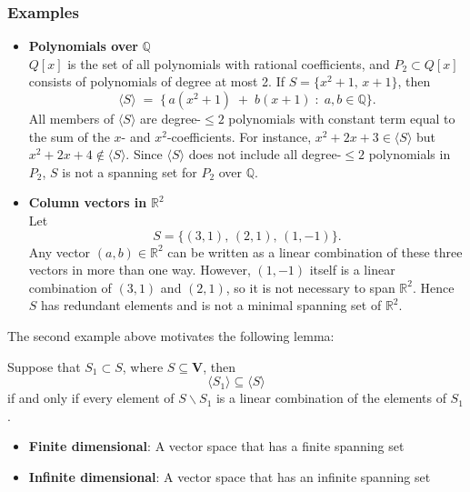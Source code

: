 \documentclass[a4paper, 9pt]{extarticle}
\begin{document}
\subsubsection*{Examples}
\begin{itemize}
  \item \textbf{Polynomials over} $\mathbb{Q}$ \\
        $Q[x]$ is the set of all polynomials with rational coefficients, and $P_{2}\subset Q[x]$ consists of polynomials of degree at most 2.
        If $S=\{x^{2}+1,\, x+1\}$, then
        $$
          \langle S\rangle \;=\;\{\,a(x^2 + 1) \;+\; b(x+1)\;:\;a,b \in \mathbb{Q}\}.
        $$
        All members of $\langle S\rangle$ are degree-$\le 2$ polynomials with constant term equal to the sum of the $x$- and $x^2$-coefficients.
        For instance, $x^2+2x+3 \in \langle S\rangle$ but $x^2+2x+4 \notin \langle S\rangle$.
        Since $\langle S\rangle$ does not include all degree-$\le 2$ polynomials in $P_{2}$, $S$ is not a spanning set for $P_{2}$ over $\mathbb{Q}$.
  \item \textbf{Column vectors in} $\mathbb{R}^2$ \\
        Let
        $$
          S=\{(3,1),\,(2,1),\,(1,-1)\}.
        $$
        Any vector $(a,b)\in \mathbb{R}^2$ can be written as a linear combination of these three vectors in more than one way.
        However, $(1,-1)$ itself is a linear combination of $(3,1)$ and $(2,1)$, so it is not necessary to span $\mathbb{R}^2$.
        Hence $S$ has redundant elements and is not a minimal spanning set of $\mathbb{R}^2$.
\end{itemize}
The second example above motivates the following lemma:
\begin{lemmabox}{}{}
  Suppose that $S_1 \subset S$, where $S \subseteq \mathbf{V}$, then
  $$\langle S_1 \rangle \subseteq \langle S \rangle$$
  if and only if every element of $S \backslash S_1$ is a linear combination of the elements of $S_1$.
\end{lemmabox}
\begin{definitionbox}{}{}
  \begin{itemize}
    \item \textbf{Finite dimensional}: A vector space that has a finite spanning set
    \item \textbf{Infinite dimensional}: A vector space that has an infinite spanning set
  \end{itemize}
\end{definitionbox}
\end{document}
